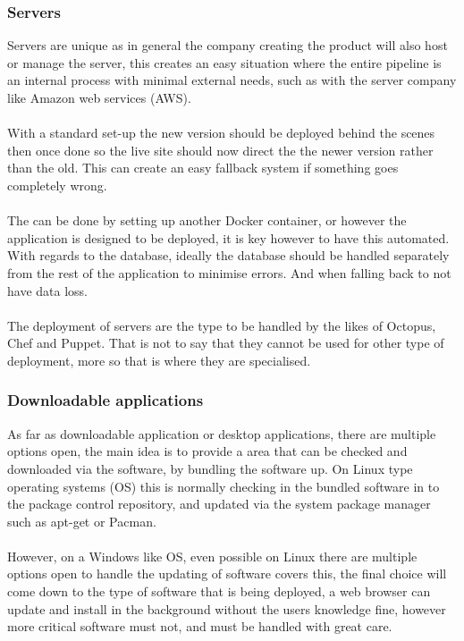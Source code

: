 \subsubsection{Servers}

Servers are unique as in general the company creating the product will also host or manage the server, this creates an easy situation where the entire pipeline is an internal process with minimal external needs, such as with the server company like Amazon web services (AWS).
\\\\
With a standard set-up the new version should be deployed behind the scenes then once done so the live site should now direct the the newer version rather than the old. This can create an easy fallback system if something goes completely wrong.
\\\\
The can be done by setting up another Docker container, or however the application is designed to be deployed, it is key however to have this automated. With regards to the database, ideally the database should be handled separately from the rest of the application to minimise errors. And when falling back to not have data loss.
\\\\
The deployment of servers are the type to be handled by the likes of Octopus, Chef and Puppet. That is not to say that they cannot be used for other type of deployment, more so that is where they are specialised.

\subsubsection{Downloadable applications}

As far as downloadable application or desktop applications, there are multiple options open, the main idea is to provide a area that can be checked and downloaded via the software, by bundling the software up. On Linux type operating systems (OS) this is normally checking in the bundled software in to the package control repository, and updated via the system package manager such as apt-get or Pacman. 
\\\\
However, on a Windows like OS, even possible on Linux there are multiple options open to handle the updating of software \cite{deploy} covers this, the final choice will come down to the type of software that is being deployed, a web browser can update and install in the background without the users knowledge fine, however more critical software must not, and must be handled with great care.


